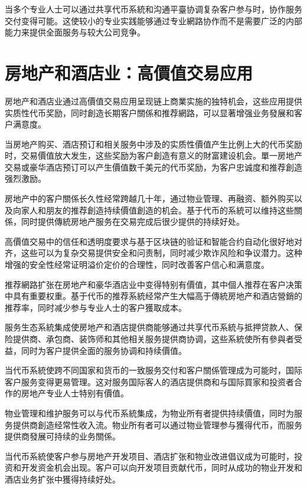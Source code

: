 \documentclass[
  Letterpaper,
]{scrbook}
\begin{document}
当多个专业人士可以通过共享代币系統和沟通平臺协调复杂客户参与时，协作服务交付变得可能。这使较小的专业实践能够通过专业網路协作而不是需要广泛的内部能力来提供全面服务与较大公司竞争。

\section{房地产和酒店业：高價值交易应用}\label{ux623fux5730ux4ea7ux548cux9152ux5e97ux4e1aux9ad8ux50f9ux503cux4ea4ux6613ux5e94ux7528}

房地产和酒店业通过高價值交易应用呈现链上商業实施的独特机会，这些应用提供实质性代币奖励，同时創造长期客户關係和推荐網路，可以显著增强业务發展和客户满意度。

当房地产购买、酒店预订和相关服务中涉及的实质性價值产生比例上大的代币奖励时，交易價值放大发生，这些奖励为客户創造有意义的財富建设机会。單一房地产交易或豪华酒店预订可以产生價值数千美元的代币奖励，为客户忠诚度和推荐創造强烈激励。

房地产中的客户關係长久性经常跨越几十年，通过物业管理、再融资、额外购买以及向家人和朋友的推荐創造持续價值創造的机会。基于代币的系統可以维持这些關係，同时提供傳統房地产服务在交易完成后很少提供的持续好处。

高價值交易中的信任和透明度要求与基于区块链的验证和智能合约自动化很好地对齐，这些可以为复杂交易提供安全和问责制，同时减少欺诈风险和争议潜力。这种增强的安全性经常证明溢价定价的合理性，同时改善客户信心和满意度。

推荐網路扩张在房地产和豪华酒店业中变得特别有價值，其中個人推荐在客户决策中具有重要权重。基于代币的推荐系統经常产生大幅高于傳統房地产和酒店營銷的推荐率，同时减少参与专业人士的客户獲取成本。

服务生态系統集成使房地产和酒店提供商能够通过共享代币系統与抵押贷款人、保险提供商、承包商、装饰师和其他相关服务提供商协调，这些系統使所有參與者受益，同时为客户提供全面的服务协调和持续價值。

当代币系統使跨不同国家和货币的一致服务交付和客户關係管理成为可能时，国际客户服务变得更易管理。这对服务国际客人的酒店提供商和与国际買家和投资者合作的房地产专业人士特别有價值。

物业管理和维护服务可以与代币系統集成，为物业所有者提供持续價值，同时为服务提供商創造经常性收入流。物业所有者可以通过物业管理参与獲得代币，而服务提供商發展可持续的业务關係。

当代币系統使客户参与房地产开发项目、酒店扩张和物业改进倡议成为可能时，投资和开发资金机会出现。客户可以向开发项目贡献代币，同时从成功的物业开发和酒店业务扩张中獲得持续好处。
\end{document}
